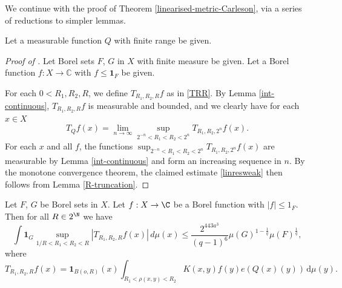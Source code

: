 We continue with the proof of Theorem \ref{linearised-metric-Carleson}, via a series of reductions to simpler lemmas.

Let a measurable function $Q$ with finite range be given.

\begin{proof}[Proof of ]
\leanok
{}
Let Borel sets $F$, $G$ in $X$ with finite measure be given. Let a Borel function $f: X \to \mathbb{C}$ with $f \le \mathbf{1}_F$ be given.

For each $0 < R_1,R_2,R$, we define $T_{R_1,R_2,R}f$ as in \eqref{TRR}.
By Lemma \ref{int-continuous},
$T_{R_1,R_2,R}f$
is measurable and bounded, and we clearly have for each $x \in X$
\[
    T_Q f(x) = \lim_{n \to \infty} \sup_{2^{-n} < R_1 < R_2 < 2^n} T_{R_1, R_2, 2^n}f(x).
\]
For each $x$ and all $f$, the functions $\sup_{2^{-n} < R_1 < R_2 < 2^n} T_{R_1, R_2, 2^n} f(x)$ are measurable by Lemma \ref{int-continuous} and form an increasing sequence in $n$. By the monotone convergence theorem, the claimed estimate \eqref{linresweak} then follows from Lemma \ref{R-truncation}.
\end{proof}

\begin{lemma}[R truncation]
    \label{R-truncation}
    \leanok

    Let $F$, $G$ be Borel sets in $X$. Let $f:X\to \C$ be a Borel function with $|f|\le 1_F$. Then for all $R\in 2^\N$ we have
    \begin{equation} \label{Rcut}
        \int \mathbf{1}_G \sup_{1/R<R_1<R_2<R} |T_{R_1,R_2,R} f(x)|\, d\mu(x) \le \frac{2^{443a^3}}{(q-1)^6} \mu(G)^{1-\frac{1}{q}} \mu(F)^{\frac{1}{q}},
    \end{equation}
    where
    \begin{equation}\label{TRR}
        T_{R_1,R_2,R} f(x)= \mathbf{1}_{B(o,R)}(x)
        \int_{R_1 < \rho(x,y) < R_2} K(x,y) f(y) e(Q(x)(y)) \, \mathrm{d}\mu(y) .
    \end{equation}
\end{lemma}

